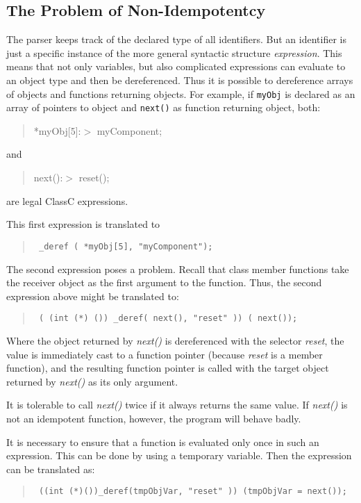 \subsection{The Problem of Non-Idempotentcy}
The parser keeps track of the declared type of all identifiers.  But an
identifier is just a specific instance of the more general syntactic
structure {\em expression}.  This means that not only variables, but
also complicated expressions can
evaluate to an object type and then be dereferenced.
Thus it is possible to dereference arrays of objects and functions returning
objects.  For example, if {\tt myObj} is declared as an array of pointers
to object and {\tt next()} as function returning object, both:
\begin{quote}
*myObj[5]:$>$ myComponent;
\end{quote}
and
\begin{quote}
next():$>$ reset();
\end{quote}
are legal ClassC expressions.

This first expression is translated to
\begin{quote} \tt
\_deref ( *myObj[5], "myComponent");
\end{quote}

The second expression poses a problem.  Recall that class member functions
take the receiver object as the first argument to the function.  Thus,
the second expression above might be translated to:
\begin{quote} \tt
( (int (*) ()) \_deref( next(), "reset" )) ( next());
\end{quote}

Where the object returned by {\em next()} is dereferenced with the
selector {\em reset}, the value is immediately cast to a function pointer
(because {\em reset} is a member function), and the resulting function pointer
is called with the target object returned by {\em next()} as its only
argument.

It is tolerable to call {\em next()} twice if it always returns the same
value.  If {\em next()} is not an idempotent function, however, the program
will behave badly.

It is necessary to ensure that a function is evaluated only once in
such an expression.  This can be done by using a temporary variable.
Then the expression can be translated as:

\begin{quote} \tt
((int (*)())\_deref(tmpObjVar, "reset" )) (tmpObjVar = next());
\end{quote}


